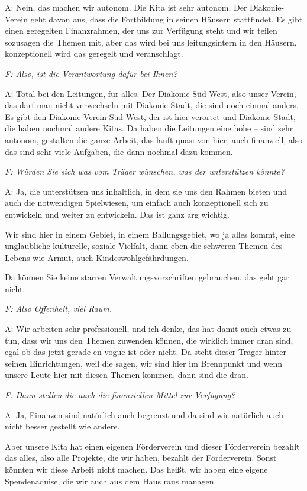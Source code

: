 \begin{linenumbers}
A: Nein, das machen wir autonom. Die Kita ist sehr autonom. Der Diakonie-Verein geht davon aus, dass die Fortbildung in seinen Häusern stattfindet. Es gibt einen geregelten Finanzrahmen, der uns zur Verfügung steht und wir teilen sozusagen die Themen mit, aber das wird bei uns leitungsintern in den Häusern, konzeptionell wird das geregelt und veranschlagt.
 
\emph{F: Also, ist die Verantwortung dafür bei Ihnen?}

A: Total bei den Leitungen, für alles. Der Diakonie Süd West, also unser Verein, das darf man nicht verwechseln mit Diakonie Stadt, die sind noch einmal anders. Es gibt den Diakonie-Verein Süd West, der ist hier verortet und Diakonie Stadt, die haben nochmal andere Kitas. Da haben die Leitungen eine hohe -- sind sehr autonom, gestalten die ganze Arbeit, das läuft quasi von hier, auch finanziell, also das sind sehr viele Aufgaben, die dann nochmal dazu kommen. 

\emph{F: Würden Sie sich was vom Träger wünschen, was der unterstützen könnte?}

A: Ja, die unterstützen uns inhaltlich, in dem sie uns den Rahmen bieten und auch die notwendigen Spielwiesen, um einfach auch konzeptionell sich zu entwickeln und weiter zu entwickeln. Das ist ganz arg wichtig. 

Wir sind hier in einem Gebiet, in einem Ballungsgebiet, wo ja alles kommt, eine unglaubliche kulturelle, soziale Vielfalt, dann eben die schweren Themen des Lebens wie Armut, auch Kindeswohlgefährdungen. 

Da können Sie keine starren Verwaltungsvorschriften gebrauchen, das geht gar nicht. 

\emph{F: Also Offenheit, viel Raum.}

A: Wir arbeiten sehr professionell, und ich denke, das hat damit auch etwas zu tun, dass wir uns den Themen zuwenden können, die wirklich immer dran sind, egal ob das jetzt gerade en vogue ist oder nicht. Da steht dieser Träger hinter seinen Einrichtungen, weil die sagen, wir sind hier im Brennpunkt und wenn unsere Leute hier mit diesen Themen kommen, dann sind die dran. 

\emph{F: Dann stellen die auch die finanziellen Mittel zur Verfügung?}

A: Ja, Finanzen sind natürlich auch begrenzt und da sind wir natürlich auch nicht besser gestellt wie andere. 

Aber unsere Kita hat einen eigenen Förderverein und dieser Förderverein bezahlt das alles, also alle Projekte, die wir haben, bezahlt der Förderverein. Sonst könnten wir diese Arbeit nicht machen. Das heißt, wir haben eine eigene Spendenaquise, die wir auch aus dem Haus raus managen. 


\end{linenumbers}
